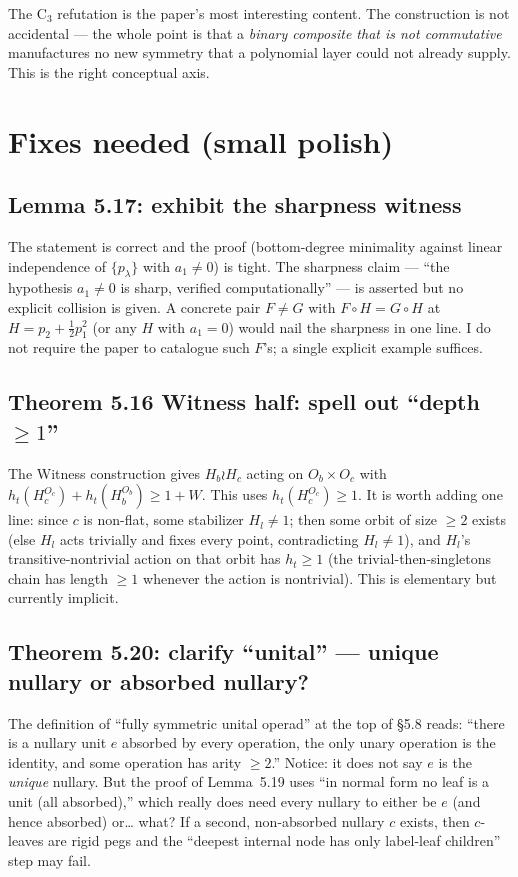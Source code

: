 \documentclass[11pt]{article}
\begin{document}
The C$_3$ refutation is the paper's most interesting content. The construction is not accidental — the whole point is that a \emph{binary composite that is not commutative} manufactures no new symmetry that a polynomial layer could not already supply. This is the right conceptual axis.

\section{Fixes needed (small polish)}

\subsection{Lemma 5.17: exhibit the sharpness witness}

The statement is correct and the proof (bottom-degree minimality against linear independence of $\{p_\lambda\}$ with $a_1 \ne 0$) is tight. The sharpness claim — ``the hypothesis $a_1 \ne 0$ is sharp, verified computationally'' — is asserted but no explicit collision is given. A concrete pair $F \ne G$ with $F \circ H = G \circ H$ at $H = p_2 + \tfrac12 p_1^2$ (or any $H$ with $a_1 = 0$) would nail the sharpness in one line. I do not require the paper to catalogue such $F$'s; a single explicit example suffices.

\subsection{Theorem 5.16 Witness half: spell out ``depth $\ge 1$''}

The Witness construction gives
$H_b \wr H_c$ acting on $O_b \times O_c$ with $h_t(H_c^{O_c}) + h_t(H_b^{O_b}) \ge 1 + W$. This uses $h_t(H_c^{O_c}) \ge 1$. It is worth adding one line: since $c$ is non-flat, some stabilizer $H_l \ne 1$; then some orbit of size $\ge 2$ exists (else $H_l$ acts trivially and fixes every point, contradicting $H_l \ne 1$), and $H_l$'s transitive-nontrivial action on that orbit has $h_t \ge 1$ (the trivial-then-singletons chain has length $\ge 1$ whenever the action is nontrivial). This is elementary but currently implicit.

\subsection{Theorem 5.20: clarify ``unital'' — unique nullary or absorbed nullary?}

The definition of ``fully symmetric unital operad'' at the top of §5.8 reads: ``there is a nullary unit $e$ absorbed by every operation, the only unary operation is the identity, and some operation has arity $\ge 2$.'' Notice: it does not say $e$ is the \emph{unique} nullary. But the proof of Lemma~5.19 uses ``in normal form no leaf is a unit (all absorbed),'' which really does need every nullary to either be $e$ (and hence absorbed) or… what? If a second, non-absorbed nullary $c$ exists, then $c$-leaves are rigid pegs and the ``deepest internal node has only label-leaf children'' step may fail.
\end{document}
